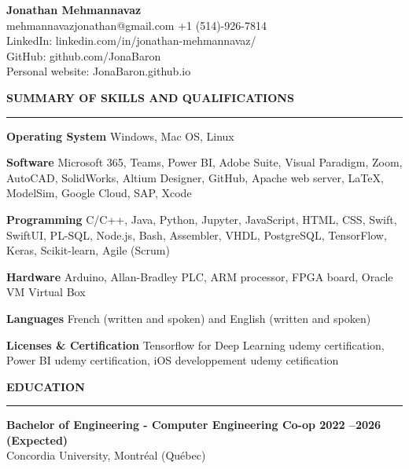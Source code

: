 \documentclass[letterpaper,11pt]{article}
\begin{document}
\begin{center}
{\LARGE\textbf{Jonathan Mehmannavaz}}
\\
mehmannavazjonathan@gmail.com \textbar{} +1 (514)-926-7814
\\
LinkedIn: linkedin.com/in/jonathan-mehmannavaz/
\\
GitHub: github.com/JonaBaron
\\
Personal website: JonaBaron.github.io
\end{center}
\textbf{SUMMARY OF SKILLS AND QUALIFICATIONS}\par
\vspace{-20pt}
\rule{\textwidth}{0.4pt}
{\small\textbf{Operating System}} \textbar{} Windows, Mac OS, Linux

{\small\textbf{Software}} \textbar{} Microsoft 365, Teams, Power BI, Adobe Suite, Visual Paradigm, Zoom, AutoCAD, SolidWorks, Altium Designer, GitHub, Apache web server, LaTeX, ModelSim, Google Cloud, SAP, Xcode

{\small\textbf{Programming}} \textbar{} C/C++, Java, Python, Jupyter, JavaScript, HTML, CSS, Swift, SwiftUI, PL-SQL, Node.js, Bash, Assembler, VHDL, PostgreSQL, TensorFlow, Keras, Scikit-learn, Agile (Scrum)

{\small\textbf{Hardware}} \textbar{} Arduino, Allan-Bradley PLC, ARM processor, FPGA board, Oracle VM Virtual Box

{\small\textbf{Languages}} \textbar{} French (written and spoken) and English
(written and spoken)

{\small\textbf{Licenses \& Certification}} \textbar{} Tensorflow for Deep Learning udemy certification, Power BI udemy certification, iOS developpement udemy cetification

\textbf{EDUCATION}\par
\vspace{-20pt}
\rule{\textwidth}{0.4pt}
\textbf{Bachelor of Engineering - Computer Engineering Co-op \hfill 2022 --2026 (Expected)}
\\Concordia University, Montréal (Québec)
\end{document}
